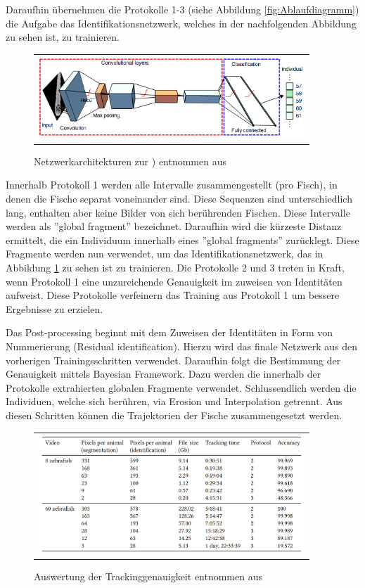 Daraufhin übernehmen die Protokolle 1-3 (siehe Abbildung \ref{fig:Ablaufdiagramm}) die Aufgabe das Identifikationsnetzwerk, welches in der nachfolgenden Abbildung zu sehen ist, zu trainieren.

\begin{figure}[H]
\centering
\begin{tabular}{l}
\includegraphics[width=100mm]{figures/Forschung/Identifikation.png} 
\end{tabular}
\caption{ Netzwerkarchitekturen zur ) \label{fig:Identifikation} entnommen aus \citet{DBLP:journals/corr/abs-1803-04351}}
\end{figure}

Innerhalb Protokoll 1 werden alle Intervalle zusammengestellt (pro Fisch), in denen die Fische separat voneinander sind. Diese Sequenzen sind unterschiedlich lang, enthalten aber keine Bilder von sich berührenden Fischen. Diese Intervalle werden als ''global fragment'' bezeichnet. Daraufhin wird die kürzeste Distanz ermittelt, die ein Individuum innerhalb eines ''global fragments'' zurücklegt. Diese Fragmente werden nun verwendet, um das Identifikationsnetzwerk, das in Abbildung \ref{fig:Identifikation} zu sehen ist zu trainieren. Die Protokolle 2 und 3 treten in Kraft, wenn Protokoll 1 eine unzureichende Genauigkeit im zuweisen von Identitäten aufweist.
Diese Protokolle verfeinern das Training aus Protokoll 1 um bessere Ergebnisse zu erzielen.

Das Post-processing beginnt mit dem Zuweisen der Identitäten in Form von Nummerierung (Residual identification). Hierzu wird das finale Netzwerk aus den vorherigen Trainingsschritten verwendet. Daraufhin folgt die Bestimmung der Genauigkeit mittels Bayesian Framework. Dazu werden die innerhalb der Protokolle extrahierten globalen Fragmente verwendet. Schlussendlich werden die Individuen, welche sich berühren, via Erosion und Interpolation getrennt. Aus diesen Schritten können die Trajektorien der Fische zusammengesetzt werden.

\begin{figure}[H]
\centering
\begin{tabular}{l}
\includegraphics[width=100mm]{figures/Experimente/Tracking/resultatNN.png} 
\end{tabular}
\caption{ Auswertung der Trackinggenauigkeit \label{fig:resultatNN} entnommen aus \citet{DBLP:journals/corr/abs-1803-04351}}
\end{figure}

